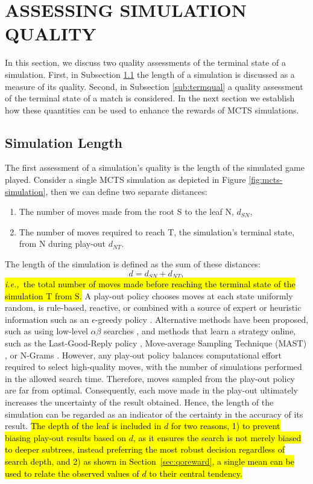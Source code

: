 \documentclass{ecai2014}
\newcommand{\node}[1]{{\fontfamily{phv}\selectfont#1}}
\newcommand{\ie}{{\it i.e.,}~}
\begin{document}
\section{ASSESSING SIMULATION QUALITY}
\label{sec:poqual}
In this section, we discuss two quality assessments of the terminal state of a simulation. First, in Subsection \ref{sub:simdur} the length of a simulation is discussed as a measure of its quality. Second, in Subsection \ref{sub:termqual} a quality assessment of the terminal state of a match is considered. In the next section we establish how these quantities can be used to enhance the rewards of MCTS simulations. 

\subsection{Simulation Length} 
\label{sub:simdur}
The first assessment of a simulation's quality is the length of the simulated game played. Consider a single MCTS simulation as depicted in Figure \ref{fig:mcts-simulation}, then we can define two separate distances: 
\begin{enumerate}
\item The number of moves made from the root \node{S} to the leaf \node{N}, $d_{SN}$,
\item The number of moves required to reach \node{T}, the simulation's terminal state, from \node{N} during play-out $d_{NT}$.
\end{enumerate}
The length of the simulation is defined as the sum of these distances:
\begin{equation}
d = d_{SN} + d_{NT},
\label{eq:m_ST}
\end{equation}
\hl{\ie the total number of moves made before reaching the terminal state of the simulation {\node{T}} from {\node{S}}.} A play-out policy chooses moves at each state uniformly random, is rule-based, reactive, or combined with a source of expert or heuristic information such as an $\epsilon$-greedy policy \cite{sturtevant2008analysis, sutton1998reinforcement}. Alternative methods have been proposed, such as using low-level $\alpha\beta$ searches \cite{Winands2011}, and methods that learn a strategy online, such as the Last-Good-Reply policy \cite{baier2010power}, Move-average Sampling Technique (MAST) \cite{finnsson2008simulation}, or N-Grams \cite{Tak2012}. However, any play-out policy balances computational effort required to select high-quality moves, with the number of simulations performed in the allowed search time. Therefore, moves sampled from the play-out policy are far from optimal. Consequently, each move made in the play-out ultimately increases the uncertainty of the result obtained. Hence, the length of the simulation can be regarded as an indicator of the certainty in the accuracy of its result. \hl{The depth of the leaf is included in $d$ for two reasons, 1) to prevent biasing play-out results based on $d$, as it ensures the search is not merely biased to deeper subtrees, instead preferring the most robust decision regardless of search depth, and 2) as shown in Section~{\ref{sec:qoreward}}, a single mean can be used to relate the observed values of $d$ to their central tendency.}
\end{document}
